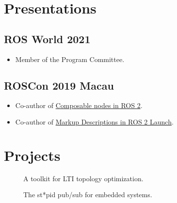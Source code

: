 \documentclass[english, letterpaper]{resume}
\begin{document}
\noindent\begin{minipage}[t]{0.475\linewidth}
  \section*{Presentations}
  \subsection*[\icon{ros}]{ROS World 2021}
  \begin{itemize}
    \item Member of the Program Committee.
  \end{itemize}
  \subsection*[\icon{ros}]{ROSCon 2019 Macau}
  \begin{itemize}
    \item Co-author of \href{https://roscon.ros.org/2019/talks/roscon2019_composablenodes.pdf}{Composable nodes in  ROS 2}.
    \item Co-author of \href{https://roscon.ros.org/2019/talks/roscon2019_markupextensionsforros2launch.pdf}{Markup Descriptions in ROS 2 Launch}.
  \end{itemize}
\end{minipage}\hfill
\begin{minipage}[t]{0.475\linewidth}
  \section*{Projects}
  \begin{description}
    \item[] A toolkit for LTI topology optimization.
    \item[] The st*pid pub/sub for embedded systems.
  \end{description}
\end{minipage}
\end{document}
